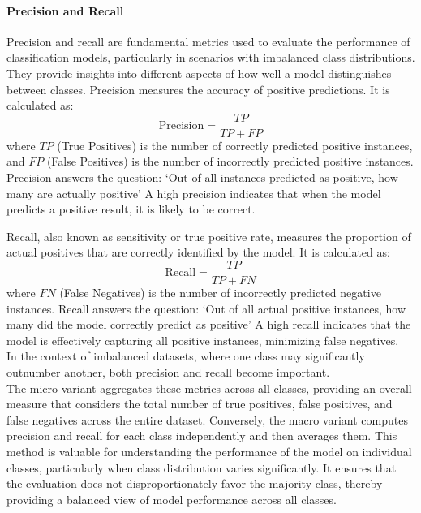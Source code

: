 \paragraph{Precision and Recall}

Precision and recall are fundamental metrics used to evaluate the performance of classification models,
particularly in scenarios with imbalanced class distributions.
They provide insights into different aspects of how well a model distinguishes between classes.
Precision measures the accuracy of positive predictions. It is calculated as:
\[
    \text{Precision} = \frac{TP}{TP + FP}
\]
where \( TP \) (True Positives) is the number of correctly predicted positive instances,
and \( FP \) (False Positives) is the number of incorrectly predicted positive instances.
Precision answers the question: `Out of all instances predicted as positive, how many are actually positive'
A high precision indicates that when the model predicts a positive result, it is likely to be correct.

Recall, also known as sensitivity or true positive rate, measures the proportion of actual positives that are correctly identified by the model.
It is calculated as:
\[
    \text{Recall} = \frac{TP}{TP + FN}
\]
where \( FN \) (False Negatives) is the number of incorrectly predicted negative instances.
Recall answers the question: `Out of all actual positive instances, how many did the model correctly predict as positive'
A high recall indicates that the model is effectively capturing all positive instances, minimizing false negatives.\\
In the context of imbalanced datasets, where one class may significantly outnumber another, both precision and recall become important.\\
The micro variant aggregates these metrics across all classes, providing an overall measure that considers the total number of true positives,
false positives, and false negatives across the entire dataset.
Conversely, the macro variant computes precision and recall for each class independently and then averages them.
This method is valuable for understanding the performance of the model on individual classes, particularly when class distribution varies significantly.
It ensures that the evaluation does not disproportionately favor the majority class, thereby providing a balanced view of model performance across all classes.\\

